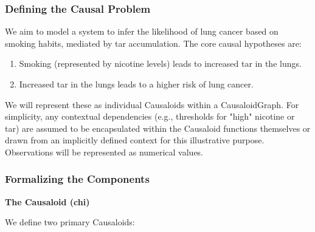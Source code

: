 \subsubsection{Defining the Causal Problem}
\label{ssec:example_problem_definition}
We aim to model a system to infer the likelihood of lung cancer based on smoking habits, mediated by tar accumulation. The core causal hypotheses are:
\begin{enumerate}
    \item Smoking (represented by nicotine levels) leads to increased tar in the lungs.
    \item Increased tar in the lungs leads to a higher risk of lung cancer.
\end{enumerate}
We will represent these as individual Causaloids within a CausaloidGraph. For simplicity, any contextual dependencies (e.g., thresholds for "high" nicotine or tar) are assumed to be encapsulated within the Causaloid functions themselves or drawn from an implicitly defined context for this illustrative purpose. Observations will be represented as numerical values.

\subsubsection{Formalizing the Components}
\label{ssec:example_formal_components}

\textbf{The Causaloid (chi)}

We define two primary Causaloids:

